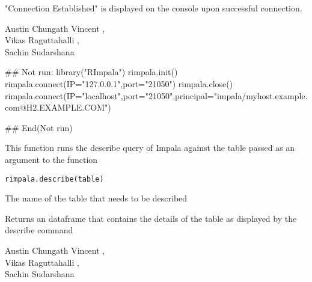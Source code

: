 \documentclass[letterpaper]{book}
\begin{document}
%
\begin{Value}
"Connection Established" is displayed on the console upon successful connection. 
\end{Value}
%
\begin{Author}\relax
Austin Chungath Vincent ,\\{}
Vikas Raguttahalli ,\\{}
Sachin Sudarshana 
\end{Author}
%
\begin{Examples}
\begin{ExampleCode}
## Not run: 
library("RImpala")
rimpala.init()
rimpala.connect(IP="127.0.0.1",port="21050")
rimpala.close()
rimpala.connect(IP="localhost",port="21050",principal="impala/myhost.example.com@H2.EXAMPLE.COM")

## End(Not run)
\end{ExampleCode}
\end{Examples}
%
\begin{Description}\relax
This function runs the describe query of Impala against the table passed as an argument to the function
\end{Description}
%
\begin{Usage}
\begin{verbatim}
rimpala.describe(table)
\end{verbatim}
\end{Usage}
%
\begin{Arguments}
\begin{ldescription}
\item[\code{table}] 
The name of the table that needs to be described

\end{ldescription}
\end{Arguments}
%
\begin{Value}
Returns an dataframe that contains the details of the table as displayed by the describe command
\end{Value}
%
\begin{Author}\relax
Austin Chungath Vincent ,\\{}
Vikas Raguttahalli ,\\{}
Sachin Sudarshana 
\end{Author}
\end{document}

